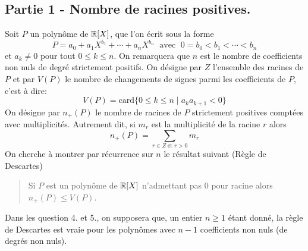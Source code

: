 \subsection*{Partie 1 - Nombre de racines positives.}
Soit $P$ un polyn{\^o}me de $\mathbb{R}[X]$, que l'on {\'e}crit sous la forme
\begin{displaymath}
  P=a_0 + a_1X^{b_1}+\cdots + a_n X^{b_n} \;\text{ avec }\; 0=b_0<b_1<\cdots <b_n
\end{displaymath}
et $a_k \neq 0$ pour tout $0 \leq k\leq n$. On remarquera que $n$ est le nombre de coefficients non nuls de degré strictement positifs.\newline
On d{\'e}signe par $Z$ l'ensemble des racines de $P$ et par $V(P)$ le nombre de changements de signes parmi les coefficients de $P$, c'est à dire:
\begin{displaymath}
  V(P)=\mathrm{card} \{0 \leq k \leq n \; | \; a_k a_{k+1} <0 \}
\end{displaymath}
On d{\'e}signe par $n_+(P)$ le nombre de racines de $P$ strictement positives compt{\'e}es avec multiplicit{\'e}s. Autrement dit, si $m_r$ est
la multiplicit{\'e} de la racine $r$ alors
\begin{displaymath}
  n_+(P)=\sum_{r \in Z \; \mathrm{et} \; r>0} m_r
\end{displaymath}
On cherche {\`a} montrer par récurrence sur $n$ le r{\'e}sultat suivant (R{\`e}gle de Descartes)
\begin{quote}
Si $P$ est un polyn{\^o}me de $\mathbb{R}[X]$ n'admettant pas $0$ pour racine alors $n_+(P)\leq V(P)$.
\end{quote}
Dans les question 4. et 5., on supposera que, un entier $n\geq1$ étant donné, la règle de Descartes est vraie pour les polynômes avec $n-1$ coefficients non nuls (de degrés non nuls).
